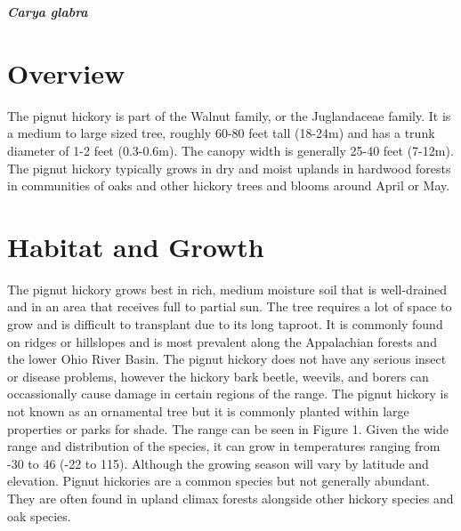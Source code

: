 \documentclass{article}\usepackage[]{graphicx}\usepackage[]{color}
\begin{document}
\renewcommand{\thetable}{\arabic{table}}
\renewcommand{\thefigure}{\arabic{figure}}
\renewcommand{\labelitemi}{$-$}
{\huge\textbf{\textit{Carya glabra}}}

\section*{Overview}
The pignut hickory is part of the Walnut family, or the Juglandaceae family. It is a medium to large sized tree, roughly 60-80 feet tall (18-24m) and has a trunk diameter of 1-2 feet (0.3-0.6m). The canopy width is generally 25-40 feet (7-12m). The pignut hickory typically grows in dry and moist uplands in hardwood forests in communities of oaks and other hickory trees and blooms around April or May. 
\section*{Habitat and Growth}
The pignut hickory grows best in rich, medium moisture soil that is well-drained and in an area that receives full to partial sun. The tree requires a lot of space to grow and is difficult to transplant due to its long taproot. It is commonly found on ridges or hillslopes and is most prevalent along the Appalachian forests and the lower Ohio River Basin. The pignut hickory does not have any serious insect or disease problems, however the hickory bark beetle, weevils,  and borers can occassionally cause damage in certain regions of the range. The pignut hickory is not known as an ornamental tree but it is commonly planted within large properties or parks for shade. The range can be seen in Figure 1. Given the wide range and distribution of the species, it can grow in temperatures ranging from -30 to 46 (-22 to 115). Although the growing season will vary by latitude and elevation. Pignut hickories are a common species but not generally abundant. They are often found in upland climax forests alongside other hickory species and oak species. 
\end{document}
